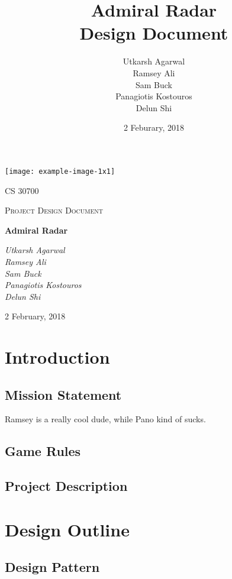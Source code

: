 \documentclass[12pt]{article}
\title{ Admiral Radar \\ \large Design Document}
\author{Utkarsh Agarwal\\ Ramsey Ali \\ Sam Buck \\ Panagiotis Kostouros \\ Delun Shi }
\date{2 Feburary, 2018}
\begin{document}
\begin{titlepage}
	\centering
	\texttt{[image: example-image-1x1]}\par\vspace{1cm}
	{\scshape\LARGE CS 30700 \par}
	{\scshape\Large Project Design Document\par}
	\vspace{1.5cm}
	{\Huge\bfseries Admiral Radar\par}
	\vspace{2cm}
	{\Large\itshape Utkarsh Agarwal\\ Ramsey Ali \\ Sam Buck \\ Panagiotis Kostouros \\ Delun Shi \par}

	\vfill
	{\large 2 February, 2018 \par}
\end{titlepage}

\tableofcontents

\section{Introduction}

\subsection{Mission Statement}

Ramsey is a really cool dude, while Pano kind of sucks.
\subsection{Game Rules}

\subsection{Project Description}



\section{Design Outline}

\subsection{Design Pattern}
\end{document}
